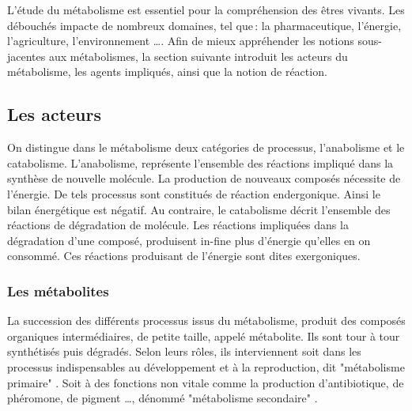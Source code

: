 \begin{refsection}
    L'étude du métabolisme est essentiel pour la compréhension des êtres vivants. Les débouchés impacte de nombreux domaines, tel que : la pharmaceutique, l'énergie, l'agriculture, l'environnement \ldots . Afin de mieux appréhender les notions sous-jacentes aux métabolismes, la section suivante introduit les acteurs du métabolisme, les agents impliqués, ainsi que la notion de réaction.

    \subsection{Les acteurs}
    
    On distingue dans le métabolisme deux catégories de processus, l'anabolisme et le catabolisme. L'anabolisme, représente l'ensemble des réactions impliqué dans la synthèse de nouvelle molécule. La production de nouveaux composés nécessite de l'énergie. De tels processus sont constitués de réaction endergonique. Ainsi le bilan énergétique est négatif.  Au contraire, le catabolisme décrit l'ensemble des réactions de dégradation de molécule. Les réactions impliquées dans la dégradation d'une composé, produisent in-fine plus d'énergie qu'elles en on consommé. Ces réactions produisant de l'énergie sont dites exergoniques.
    
    \subsubsection{Les métabolites}
    
    La succession des différents processus issus du métabolisme, produit des composés organiques intermédiaires, de petite taille, appelé métabolite. Ils sont tour à tour synthétisés puis dégradés. Selon leurs rôles, ils interviennent soit dans les processus indispensables au développement et à la reproduction, dit "métabolisme primaire" . Soit à des fonctions non vitale comme la production d'antibiotique, de phéromone, de pigment \ldots, dénommé "métabolisme secondaire" .
    
    

\end{refsection}
